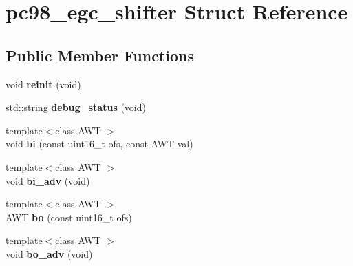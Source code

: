 \hypertarget{structpc98__egc__shifter}{\section{pc98\-\_\-egc\-\_\-shifter Struct Reference}
\label{structpc98__egc__shifter}
}
\subsection*{Public Member Functions}
\begin{DoxyCompactItemize}
\item 
\hypertarget{structpc98__egc__shifter_a821d8576bb5d2d28ac9694aaac4f8e6d}{void {\bfseries reinit} (void)}\label{structpc98__egc__shifter_a821d8576bb5d2d28ac9694aaac4f8e6d}

\item 
\hypertarget{structpc98__egc__shifter_af2a2643fdb3c7a6514de8ef3002d5fb8}{std\-::string {\bfseries debug\-\_\-status} (void)}\label{structpc98__egc__shifter_af2a2643fdb3c7a6514de8ef3002d5fb8}

\item 
\hypertarget{structpc98__egc__shifter_a0bfb40dd8fc0ea6f3e906706fb3758f5}{{\footnotesize template$<$class A\-W\-T $>$ }\\void {\bfseries bi} (const uint16\-\_\-t ofs, const A\-W\-T val)}\label{structpc98__egc__shifter_a0bfb40dd8fc0ea6f3e906706fb3758f5}

\item 
\hypertarget{structpc98__egc__shifter_a19e46dc37dd6c9ebd635cc16abd25ace}{{\footnotesize template$<$class A\-W\-T $>$ }\\void {\bfseries bi\-\_\-adv} (void)}\label{structpc98__egc__shifter_a19e46dc37dd6c9ebd635cc16abd25ace}

\item 
\hypertarget{structpc98__egc__shifter_a59e687c965915258b8ef15388207295a}{{\footnotesize template$<$class A\-W\-T $>$ }\\A\-W\-T {\bfseries bo} (const uint16\-\_\-t ofs)}\label{structpc98__egc__shifter_a59e687c965915258b8ef15388207295a}

\item 
\hypertarget{structpc98__egc__shifter_a3566495d2e7d09e82a181487dc668a02}{{\footnotesize template$<$class A\-W\-T $>$ }\\void {\bfseries bo\-\_\-adv} (void)}\label{structpc98__egc__shifter_a3566495d2e7d09e82a181487dc668a02}


\end{DoxyCompactItemize}
